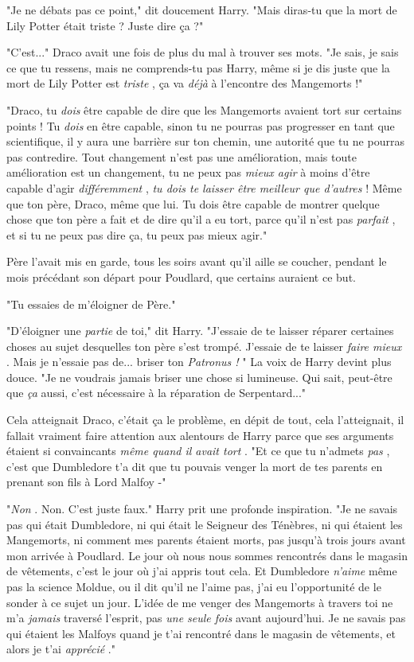 "Je ne débats pas ce point," dit doucement Harry. "Mais diras-tu que la mort de Lily Potter était triste ? Juste dire ça ?"

"C'est..." Draco avait une fois de plus du mal à trouver ses mots. "Je sais, je sais ce que tu ressens, mais ne comprends-tu pas Harry, même si je dis juste que la mort de Lily Potter est \emph{triste} , ça va \emph{déjà}  à l'encontre des Mangemorts !"

"Draco, tu \emph{dois}  être capable de dire que les Mangemorts avaient tort sur certains points ! Tu \emph{dois}  en être capable, sinon tu ne pourras pas progresser en tant que scientifique, il y aura une barrière sur ton chemin, une autorité que tu ne pourras pas contredire. Tout changement n'est pas une amélioration, mais toute amélioration est un changement, tu ne peux pas \emph{mieux agir}  à moins d'être capable d'agir \emph{différemment} , \emph{tu dois te laisser être meilleur que d'autres}  ! Même que ton père, Draco, même que lui. Tu dois être capable de montrer quelque chose que ton père a fait et de dire qu'il a eu tort, parce qu'il n'est pas \emph{parfait} , et si tu ne peux pas dire ça, tu peux pas mieux agir."

Père l'avait mis en garde, tous les soirs avant qu'il aille se coucher, pendant le mois précédant son départ pour Poudlard, que certains auraient ce but.

"Tu essaies de m'éloigner de Père."

"D'éloigner une \emph{partie}  de toi," dit Harry. "J'essaie de te laisser réparer certaines choses au sujet desquelles ton père s'est trompé. J'essaie de te laisser \emph{faire mieux} . Mais je n'essaie pas de... briser ton \emph{Patronus !} " La voix de Harry devint plus douce. "Je ne voudrais jamais briser une chose si lumineuse. Qui sait, peut-être que \emph{ça}  aussi, c'est nécessaire à la réparation de Serpentard..."

Cela atteignait Draco, c'était ça le problème, en dépit de tout, cela l'atteignait, il fallait vraiment faire attention aux alentours de Harry parce que ses arguments étaient si convaincants \emph{même quand il avait tort} . "Et ce que tu n'admets \emph{pas} , c'est que Dumbledore t'a dit que tu pouvais venger la mort de tes parents en prenant son fils à Lord Malfoy -"

"\emph{Non} . Non. C'est juste faux." Harry prit une profonde inspiration. "Je ne savais pas qui était Dumbledore, ni qui était le Seigneur des Ténèbres, ni qui étaient les Mangemorts, ni comment mes parents étaient morts, pas jusqu'à trois jours avant mon arrivée à Poudlard. Le jour où nous nous sommes rencontrés dans le magasin de vêtements, c'est le jour où j'ai appris tout cela. Et Dumbledore \emph{n'aime}  même pas la science Moldue, ou il dit qu'il ne l'aime pas, j'ai eu l'opportunité de le sonder à ce sujet un jour. L'idée de me venger des Mangemorts à travers toi ne m'a \emph{jamais}  traversé l'esprit, pas \emph{une seule fois}  avant aujourd'hui. Je ne savais pas qui étaient les Malfoys quand je t'ai rencontré dans le magasin de vêtements, et alors je t'ai \emph{apprécié} ."


